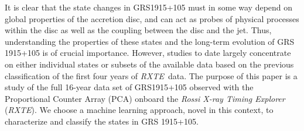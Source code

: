 \documentclass[12pt]{emulateapj}
\newcommand{\project}[1]{\textsl{#1}}
\newcommand{\rxte}{\project{RXTE}}
\begin{document}
It is clear that the state changes in GRS1915+105 must in some way depend on global properties of the accretion disc, and can act as probes of physical processes within the disc as well as the coupling between the disc and the jet. Thus, understanding the properties of these states and the long-term evolution of GRS 1915+105 is of crucial importance. However, studies to date largely concentrate on either individual states or subsets of the available data based on the previous classification of the first four years of \rxte\ data. 
The purpose of this paper is a study of the full 16-year data set of GRS1915+105 observed with the Proportional Counter Array (PCA) onboard the \textit{Rossi X-ray Timing Explorer} (\rxte). We choose a machine learning approach, novel in this context, to characterize and classify the states in GRS 1915+105. 
\end{document}
